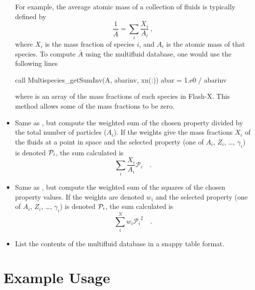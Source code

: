 \begin{itemize}
For example, the average atomic mass of a collection of fluids is typically
defined by
\begin{equation}
\frac{1}{\bar{A}} = \sum_i \frac{X_i}{A_i}~,
\end{equation}
where $X_i$ is the mass fraction of species $i$, and $A_i$ is the
atomic mass of that species.  To compute $\bar{A}$ using the multifluid
database, one would use the following lines
\begin{codeseg}
      call Multispecies_getSumInv(A, abarinv, xn(:))
      abar = 1.e0 / abarinv
\end{codeseg}
where  is an array of the mass fractions of each species in Flash-X.
This method allows some of the mass fractions to be zero.

\item {}
Same as , but compute the weighted sum of
the chosen property divided by the total number of particles ($A_i$).
If the weights give the mass
fractions $X_i$ of the fluids at a point in space
and the selected property
(one of
$A_i$, $Z_i$, \ldots, $\gamma_i$)
is denoted ${\cal{P}}_i$,
the sum calculated is
\[
\sum_i \frac{X_i}{A_i}{\mathcal{P}_i} \quad.
\]

\item {}
Same as , but compute the weighted sum of
the squares of the chosen property values.
If the weights are denoted $w_i$
and the selected property
(one of
$A_i$, $Z_i$, \ldots, $\gamma_i$)
is denoted ${\cal{P}}_i$,
the sum calculated is
\[
\sum_i^N {w_i}{\mathcal{P}_i}^2 \quad.
\]


\item {}
List the contents of the multifluid database in a snappy table format.

\end{itemize}


\section{Example Usage}

